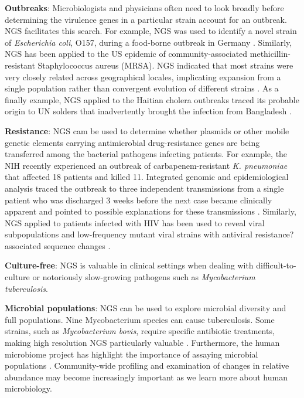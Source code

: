 \textbf{Outbreaks}: Microbiologists and physicians often need to look broadly before determining the virulence genes in a particular strain account for an outbreak. NGS facilitates this search. For example, NGS was used to identify a novel strain of \emph{Escherichia coli}, O157, during a food-borne outbreak in Germany \cite{Fox:2014fj}. Similarly, NGS has been applied to the US epidemic of community-associated methicillin-resistant Staphylococcus aureus (MRSA). NGS indicated that most strains were very closely related across geographical locales, implicating expansion from a single population rather than convergent evolution of different strains \cite{Boyd:2013cc}. As a finally example, NGS applied to the Haitian cholera outbreaks traced its probable origin to UN solders that inadvertently brought the infection from Bangladesh \cite{Boyd:2013cc}.

\textbf{Resistance}: NGS cam be used to determine whether plasmids or other mobile genetic elements carrying antimicrobial drug-resistance genes are being transferred among the bacterial pathogens infecting patients. For example, the NIH recently experienced an outbreak of carbapenem-resistant \emph{K. pneumoniae} that affected 18 patients and killed 11. Integrated genomic and epidemiological analysis traced the outbreak to three independent transmissions from a single patient who was discharged 3 weeks before the next case became clinically apparent and pointed to possible explanations for these transmissions \cite{Fox:2014fj}. Similarly, NGS applied to patients infected with HIV has been used to reveal viral subpopulations and low-frequency mutant viral strains with antiviral resistance?associated sequence changes \cite{Boyd:2013cc}.

\textbf{Culture-free}: NGS is valuable in clinical settings when dealing with difficult-to-culture or notoriously slow-growing pathogens such as \emph{Mycobacterium tuberculosis}.

\textbf{Microbial populations}: NGS can be used to explore microbial diversity and full populations. Nine Mycobacterium species can cause tuberculosis. Some strains, such as \emph{Mycobacterium bovis}, require specific antibiotic treatments, making high resolution NGS particularly valuable \cite{Fox:2014fj}. Furthermore, the human microbiome project has highlight the importance of assaying microbial populations \cite{Consortium:2012bb}. Community-wide profiling and examination of changes in relative abundance may become increasingly important as we learn more about human microbiology.


